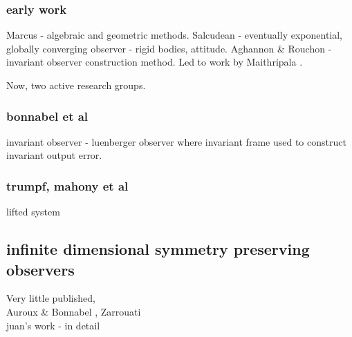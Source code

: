 \subsubsection{early work}
Marcus \cite{marcus1984algebraic} - algebraic and geometric methods.
Salcudean - eventually exponential, globally converging observer - rigid bodies, attitude.
Aghannon \& Rouchon \cite{aghannan2002invariant} - invariant observer construction method.
Led to work by Maithripala \cite{maithripala2005intrinsic}. 

Now, two active research groups.
\subsubsection{bonnabel et al}
invariant observer - luenberger observer where invariant frame used to construct invariant output error.
\subsubsection{trumpf, mahony et al}
lifted system

\subsection{infinite dimensional symmetry preserving observers}
Very little published,\\
Auroux \& Bonnabel \cite{auroux2011symmetry}, Zarrouati \cite{zarrouati2013augmented} \\
juan's work \cite{adarvefiltering} - in detail
